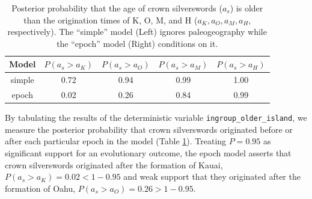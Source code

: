 \begin{table}[!h]
\centering
\begin{tabular}{c|cccc}
Model       & $P(a_s>a_K)$ & $P(a_s>a_O)$ & $P(a_s>a_M)$ & $P(a_s>a_H)$ \\ \hline
simple & 0.72 & 0.94 & 0.99 & 1.00 \\
epoch & 0.02 & 0.26 & 0.84 & 0.99 \\
\end{tabular}
\caption{Posterior probability that the age of crown silverswords ($a_s$) is older than the origination times of K, O, M, and H ($a_K, a_O, a_M, a_H$, respectively). The ``simple'' model (Left) ignores paleogeography while the ``epoch'' model (Right) conditions on it.}
\label{tab:epoch_ages}
\end{table}

By tabulating the results of the deterministic variable {\tt ingroup\_older\_island}, we measure the posterior probability that crown silverswords originated before or after each particular epoch in the model (Table \ref{tab:epoch_ages}).
Treating $P=0.95$ as significant support for an evolutionary outcome, the epoch model asserts that crown silverswords originated after the formation of Kauai, $P(a_s > a_K) = 0.02 < 1-0.95$ and weak support that they originated after the formation of Oahu, $P(a_s > a_O) = 0.26 > 1-0.95$.


\newpage
